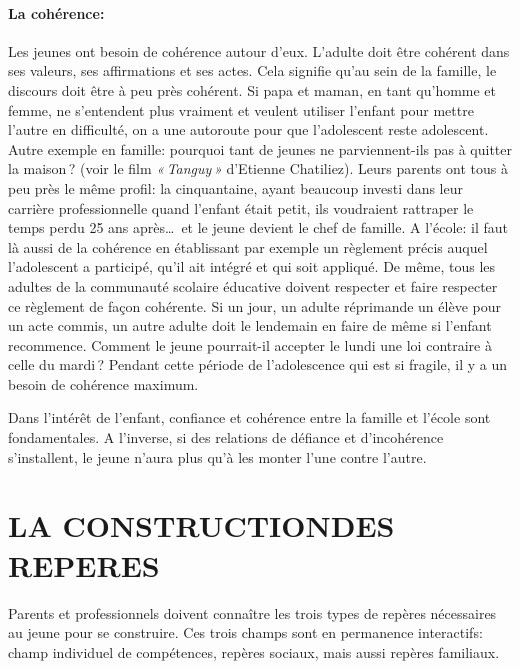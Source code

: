 \documentclass[11pt]{article} %
\begin{document}
  \paragraph{La cohérence:}  Les jeunes ont besoin de cohérence autour d'eux. L'adulte doit être cohérent dans ses valeurs, ses affirmations et ses actes.\newline
  Cela signifie qu'au sein de la famille, le discours doit être à peu près cohérent. Si papa et maman, en tant qu'homme et femme, ne s'entendent plus vraiment et veulent utiliser l'enfant pour mettre l'autre en difficulté, on a une autoroute pour que l'adolescent reste adolescent.\newline
  Autre exemple en famille: pourquoi tant de jeunes ne parviennent-ils pas à quitter la maison ? (voir le film \textit{« Tanguy »} d'Etienne Chatiliez). Leurs parents ont tous à peu près le même profil: la cinquantaine, ayant beaucoup investi dans leur carrière professionnelle quand l'enfant était petit, ils voudraient rattraper le temps perdu 25 ans après\dots\ et le jeune devient le chef de famille.\newline
  A l'école: il faut là aussi de la cohérence en établissant par exemple un règlement précis auquel l'adolescent a participé, qu'il ait intégré et qui soit appliqué. De même, tous les adultes de la communauté scolaire éducative doivent respecter et faire respecter ce règlement de façon cohérente. Si un jour, un adulte réprimande un élève pour un acte commis, un autre adulte doit le lendemain en faire de même si l'enfant recommence. Comment le jeune pourrait-il accepter le lundi une loi contraire à celle du mardi ? Pendant cette période de l'adolescence qui est si fragile, il y a un besoin de cohérence maximum.

  Dans l'intérêt de l'enfant, confiance et cohérence entre la famille et l'école sont fondamentales. A l'inverse, si des relations de défiance et d'incohérence s'installent, le jeune n'aura plus qu'à les monter l'une contre l'autre.


\section{LA CONSTRUCTIONDES REPERES}

  Parents et professionnels doivent connaître les trois types de repères nécessaires au jeune pour se construire. Ces trois champs sont en permanence interactifs: champ individuel de compétences, repères sociaux, mais aussi repères familiaux.
\end{document}
